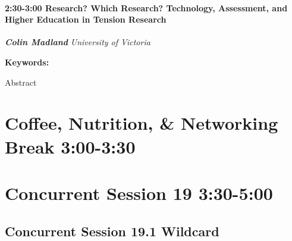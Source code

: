 \documentclass[
]{book}
\begin{document}
\begin{session}
\hypertarget{research-which-research-technology-assessment-and-higher-education-in-tension-research}{%
\paragraph*{\texorpdfstring{2:30-3:00 \textbar{} \textbf{Research? Which
Research? Technology, Assessment, and Higher Education in Tension}
\textbar{}
Research}{2:30-3:00 \textbar{} Research? Which Research? Technology, Assessment, and Higher Education in Tension \textbar{} Research}}\label{research-which-research-technology-assessment-and-higher-education-in-tension-research}}

\textbf{\emph{Colin Madland}} \textbar{} \emph{University of Victoria}

\textbf{Keywords:}

Abstract
\end{session}

\hypertarget{coffee-nutrition-networking-break-300-330-4}{%
\section*{Coffee, Nutrition, \& Networking Break \textbar{} 3:00-3:30}\label{coffee-nutrition-networking-break-300-330-4}}

\hypertarget{concurrent-session-19-330-500}{%
\section*{Concurrent Session 19 \textbar{} 3:30-5:00}\label{concurrent-session-19-330-500}}

\hypertarget{concurrent-session-19.1-wildcard}{%
\subsection*{Concurrent Session 19.1 \textbar{} Wildcard}\label{concurrent-session-19.1-wildcard}}
\end{document}
